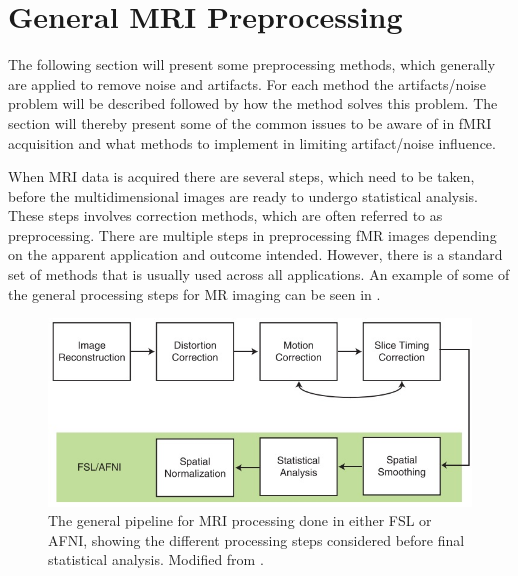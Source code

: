 

\section{General MRI Preprocessing}

The following section will present some preprocessing methods, which generally are applied to remove noise and artifacts. For each method the artifacts/noise problem will be described followed by how the method solves this problem. The section will thereby present some of the common issues to be aware of in fMRI acquisition and what methods to implement in limiting artifact/noise influence.   

When MRI data is acquired there are several steps, which need to be taken, before the multidimensional images are ready to undergo statistical analysis. These steps involves correction methods, which are often referred to as preprocessing. \cite{Moayedi2018} 
There are multiple steps in preprocessing fMR images depending on the apparent application and outcome intended. However, there is a standard set of methods that is usually used across all applications. An example of some of the general processing steps for MR imaging can be seen in . \cite{Poldrack2011} 

\begin{figure}[H]                 
	\includegraphics[width=.8\textwidth]{figures/aBackground/processing}  
	\caption{The general pipeline for MRI processing done in either FSL or AFNI, showing the different processing steps considered before final statistical analysis. Modified from \cite{Poldrack2011}.}
	\label{fig:back:pipeline} 
\end{figure}


